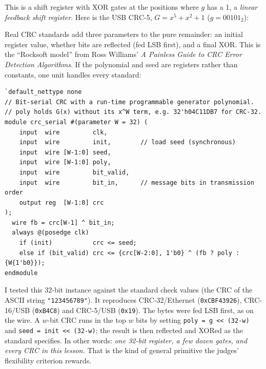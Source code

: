This is a shift register with XOR gates at the positions where $g$ has a 1,
a \emph{linear feedback shift register}. Here is the USB CRC-5,
$G = x^5+x^2+1$ ($g = 00101_2$):
\begin{center}
\end{center}

Real CRC standards add three parameters to the pure remainder: an initial
register value, whether bits are reflected (fed LSB first), and a final
XOR. This is the ``Rocksoft model'' from Ross Williams' \emph{A Painless
Guide to CRC Error Detection Algorithms}. If the polynomial and seed are
registers rather than constants, one unit handles every standard:
{\small
\begin{verbatim}
`default_nettype none
// Bit-serial CRC with a run-time programmable generator polynomial.
// poly holds G(x) without its x^W term, e.g. 32'h04C11DB7 for CRC-32.
module crc_serial #(parameter W = 32) (
    input  wire         clk,
    input  wire         init,        // load seed (synchronous)
    input  wire [W-1:0] seed,
    input  wire [W-1:0] poly,
    input  wire         bit_valid,
    input  wire         bit_in,      // message bits in transmission order
    output reg  [W-1:0] crc
);
  wire fb = crc[W-1] ^ bit_in;
  always @(posedge clk)
    if (init)           crc <= seed;
    else if (bit_valid) crc <= {crc[W-2:0], 1'b0} ^ (fb ? poly : {W{1'b0}});
endmodule
\end{verbatim}
}
I tested this 32-bit instance against the standard check values (the CRC of
the ASCII string \texttt{"123456789"}). It reproduces CRC-32/Ethernet
(\texttt{0xCBF43926}), CRC-16/USB (\texttt{0xB4C8}) and CRC-5/USB
(\texttt{0x19}). The bytes were fed LSB first, as on the wire. A $w$-bit CRC
runs in the top $w$ bits by setting \texttt{poly = g << (32-w)} and
\texttt{seed = init << (32-w)}; the result is then reflected and XORed as
the standard specifies. In other words: \emph{one 32-bit register, a few
dozen gates, and every CRC in this lesson.} That is the kind of general
primitive the judges' flexibility criterion rewards.

